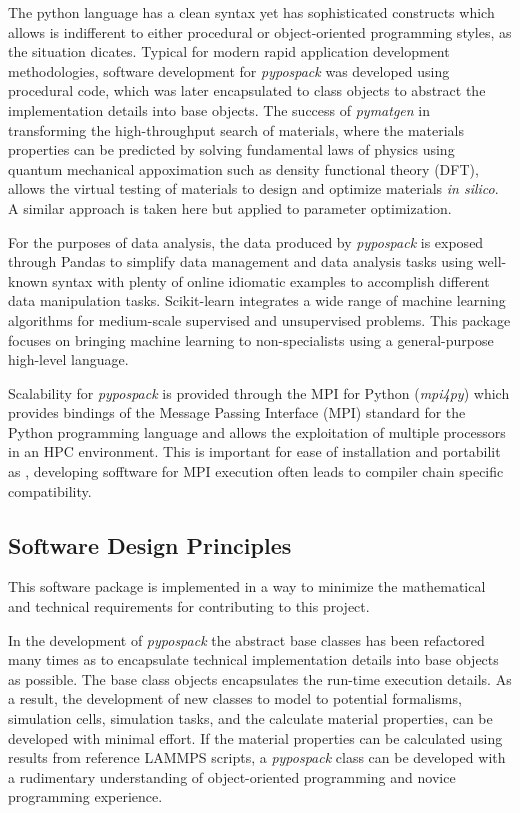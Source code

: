 The python language has a clean syntax yet has sophisticated constructs which allows is indifferent to either procedural or object-oriented programming styles, as the situation dicates.  Typical for modern  rapid application development methodologies, software development for \emph{pypospack} was developed using procedural code, which was later encapsulated to class objects to abstract the implementation details into base objects.  The success of \emph{pymatgen} in transforming the high-throughput search of materials,  where the materials properties can be predicted by solving fundamental laws of physics using quantum mechanical appoximation such as density functional theory (DFT), allows the virtual testing of materials to design and optimize materials \emph{in silico}.  A similar approach is taken here but applied to parameter optimization.

For the purposes of data analysis, the data produced by \emph{pypospack} is exposed through Pandas\cite{mckinney2010_pandas} to simplify data management and data analysis tasks using well-known syntax with plenty of online idiomatic examples to accomplish different data manipulation tasks.
Scikit-learn\cite{pedregosa2011_sklearn} integrates a wide range of machine learning algorithms for medium-scale supervised and unsupervised problems. This package focuses on bringing machine learning to non-specialists using a general-purpose high-level language.

Scalability for \emph{pypospack} is provided through the MPI for Python (\emph{mpi4py})\cite{dalcin2005_mpi4py,dalcin2008_mpi4py} which provides bindings of the Message Passing Interface (MPI)\cite{mpi2015} standard for the Python programming language and allows the exploitation of multiple processors in an HPC environment.  This is important for ease of installation and portabilit as , developing sofftware for MPI execution often leads to compiler chain specific compatibility.

\subsection{Software Design Principles}

This software package is implemented in a way to minimize the mathematical and technical requirements for contributing to this project.

In the development of \emph{pypospack} the abstract base classes has been refactored many times as to encapsulate technical implementation details into base objects as possible.  The base class objects encapsulates the run-time execution details.  As a result, the development of new classes to model to potential formalisms, simulation cells, simulation tasks, and the calculate material properties, can be developed with minimal effort.  If the material properties can be calculated using results from reference LAMMPS scripts, a \emph{pypospack} class can be developed with a rudimentary understanding of object-oriented programming and novice programming experience.

